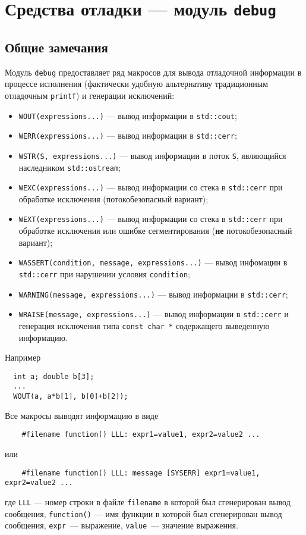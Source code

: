 \section{Средства отладки --- модуль {\tt debug}}
\subsection{Общие замечания}
Модуль \verb'debug' предоставляет ряд макросов для вывода отладочной информации в процессе исполнения
(фактически удобную альтернативу традиционным отладочным \verb'printf') и генерации исключений:
\begin{itemize}
  \item\verb'WOUT(expressions...)' --- вывод информации в \verb'std::cout';
  \item\verb'WERR(expressions...)' --- вывод информации в \verb'std::cerr';
  \item\verb'WSTR(S, expressions...)' --- вывод информации в поток \verb'S', являющийся наследником \verb'std::ostream';
  \item\verb'WEXC(expressions...)' --- вывод информации со стека в \verb'std::cerr' при обработке исключения (потокобезопасный вариант); 
  \item\verb'WEXT(expressions...)' --- вывод информации со стека в \verb'std::cerr' при обработке исключения или ошибке сегментирования
    ({\bf не} потокобезопасный вариант); 
  \item\verb'WASSERT(condition, message, expressions...)' --- вывод инфомации в \verb'std::cerr'
    при нарушении условия \verb'condition';
  \item\verb'WARNING(message, expressions...)' --- вывод информации в \verb'std::cerr';
  \item\verb'WRAISE(message, expressions...)' --- вывод информации в \verb'std::cerr'
    и генерация исключения типа \verb'const char *' содержащего выведенную информацию.
\end{itemize}
Например
\begin{verbatim}
  int a; double b[3];
  ...
  WOUT(a, a*b[1], b[0]+b[2]);
\end{verbatim}

Все макросы выводят информацию в виде
\begin{verbatim}
    #filename function() LLL: expr1=value1, expr2=value2 ...
\end{verbatim}
или
\begin{verbatim}
    #filename function() LLL: message [SYSERR] expr1=value1, expr2=value2 ...
\end{verbatim}
где \verb'LLL' --- номер строки в файле \verb'filename' в которой был сгенерирован вывод сообщения,
\verb'function()' --- имя функции в которой был сгенерирован вывод сообщения, \verb'expr'~--- выражение,
\verb'value'~--- значение выражения.

